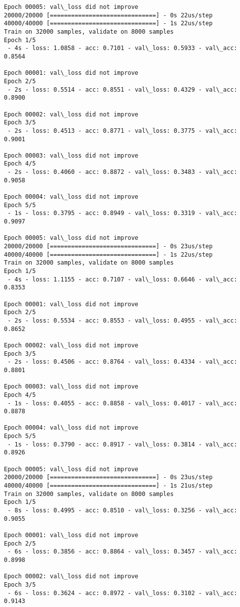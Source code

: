 \documentclass[11pt]{article}
\begin{document}
\begin{Verbatim}[commandchars=\\\{\}]
Epoch 00005: val\_loss did not improve
20000/20000 [==============================] - 0s 22us/step
40000/40000 [==============================] - 1s 22us/step
Train on 32000 samples, validate on 8000 samples
Epoch 1/5
 - 4s - loss: 1.0858 - acc: 0.7101 - val\_loss: 0.5933 - val\_acc: 0.8564

Epoch 00001: val\_loss did not improve
Epoch 2/5
 - 2s - loss: 0.5514 - acc: 0.8551 - val\_loss: 0.4329 - val\_acc: 0.8900

Epoch 00002: val\_loss did not improve
Epoch 3/5
 - 2s - loss: 0.4513 - acc: 0.8771 - val\_loss: 0.3775 - val\_acc: 0.9001

Epoch 00003: val\_loss did not improve
Epoch 4/5
 - 2s - loss: 0.4060 - acc: 0.8872 - val\_loss: 0.3483 - val\_acc: 0.9058

Epoch 00004: val\_loss did not improve
Epoch 5/5
 - 1s - loss: 0.3795 - acc: 0.8949 - val\_loss: 0.3319 - val\_acc: 0.9097

Epoch 00005: val\_loss did not improve
20000/20000 [==============================] - 0s 23us/step
40000/40000 [==============================] - 1s 22us/step
Train on 32000 samples, validate on 8000 samples
Epoch 1/5
 - 4s - loss: 1.1155 - acc: 0.7107 - val\_loss: 0.6646 - val\_acc: 0.8353

Epoch 00001: val\_loss did not improve
Epoch 2/5
 - 2s - loss: 0.5534 - acc: 0.8553 - val\_loss: 0.4955 - val\_acc: 0.8652

Epoch 00002: val\_loss did not improve
Epoch 3/5
 - 2s - loss: 0.4506 - acc: 0.8764 - val\_loss: 0.4334 - val\_acc: 0.8801

Epoch 00003: val\_loss did not improve
Epoch 4/5
 - 1s - loss: 0.4055 - acc: 0.8858 - val\_loss: 0.4017 - val\_acc: 0.8878

Epoch 00004: val\_loss did not improve
Epoch 5/5
 - 1s - loss: 0.3790 - acc: 0.8917 - val\_loss: 0.3814 - val\_acc: 0.8926

Epoch 00005: val\_loss did not improve
20000/20000 [==============================] - 0s 23us/step
40000/40000 [==============================] - 1s 21us/step
Train on 32000 samples, validate on 8000 samples
Epoch 1/5
 - 8s - loss: 0.4995 - acc: 0.8510 - val\_loss: 0.3256 - val\_acc: 0.9055

Epoch 00001: val\_loss did not improve
Epoch 2/5
 - 6s - loss: 0.3856 - acc: 0.8864 - val\_loss: 0.3457 - val\_acc: 0.8998

Epoch 00002: val\_loss did not improve
Epoch 3/5
 - 6s - loss: 0.3624 - acc: 0.8972 - val\_loss: 0.3102 - val\_acc: 0.9143


\end{Verbatim}
\end{document}
